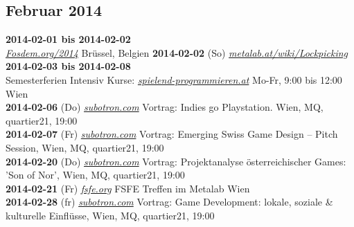 \documentclass[10pt,a4paper,ngerman,twoside]{article} %
\begin{document}
\subsection*{Februar 2014}
\textbf{2014-02-01 bis 2014-02-02}\\ \href{https://fosdem.org/2014/}{\textit{Fosdem.org/2014}} Brüssel, Belgien
\textbf{2014-02-02} (So) \href{https://metalab.at/wiki/Lockpicking}{\textit{metalab.at/wiki/Lockpicking}}\\
\textbf{2014-02-03 bis 2014-02-08}\\ Semesterferien Intensiv Kurse: \href{http://spielend-programmieren.at}{\textit{spielend-programmieren.at}} Mo-Fr, 9:00 bis 12:00 Wien\\ 
\textbf{2014-02-06} (Do) \href{http://subotron.com/veranstaltung/playstationheartsdevs/}{\textit{subotron.com}} Vortrag: Indies go Playstation. Wien, MQ, quartier21, 19:00\\
\textbf{2014-02-07} (Fr) \href{http://subotron.com/veranstaltung/emerging-swiss-game-design/}{\textit{subotron.com}} Vortrag: Emerging Swiss Game Design – Pitch Session, Wien, MQ, quartier21, 19:00\\
\textbf{2014-02-20} (Do) \href{http://subotron.com/veranstaltung/son-of-nor/}{\textit{subotron.com}} Vortrag: Projektanalyse österreichischer Games: 'Son of Nor', Wien, MQ, quartier21, 19:00\\
\textbf{2014-02-21} (Fr) \href{http://fsfe.org}{\textit{fsfe.org}} FSFE Treffen im Metalab Wien\\
\textbf{2014-02-28} (fr) \href{http://subotron.com/veranstaltung/local-social-cultural/}{\textit{subotron.com}} Vortrag: Game Development: lokale, soziale \& kulturelle Einflüsse, Wien, MQ, quartier21, 19:00\\
\end{document}
